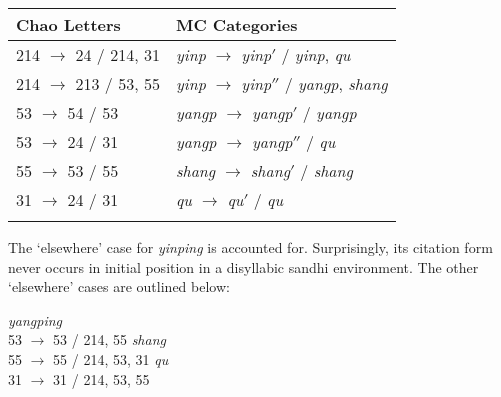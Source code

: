 \documentclass{article}
\begin{document}
\begin{exe}
\ex
\begin{tabular}[t]{ll}
Chao Letters & MC Categories \\
\hline
214 $\rightarrow$ 24 / \underline{\hspace{1em}} 214, 31 & \textit{yinp} $\rightarrow$ \textit{yinp}$'$ / \underline{\hspace{1em}} \textit{yinp}, \textit{qu} \\
214 $\rightarrow$ 213 / \underline{\hspace{1em}} 53, 55 & \textit{yinp} $\rightarrow$ \textit{yinp}$''$ / \underline{\hspace{1em}} \textit{yangp}, \textit{shang} \\
53 $\rightarrow$ 54 / \underline{\hspace{1em}} 53 & \textit{yangp} $\rightarrow$ \textit{yangp}$'$ / \underline{\hspace{1em}} \textit{yangp} \\
53 $\rightarrow$ 24 / \underline{\hspace{1em}} 31 & \textit{yangp} $\rightarrow$ \textit{yangp}$''$ / \underline{\hspace{1em}} \textit{qu} \\
55 $\rightarrow$ 53 / \underline{\hspace{1em}} 55 & \textit{shang} $\rightarrow$ \textit{shang}$'$ / \underline{\hspace{1em}} \textit{shang} \\
31 $\rightarrow$ 24 / \underline{\hspace{1em}} 31 & \textit{qu} $\rightarrow$ \textit{qu}$'$ / \underline{\hspace{1em}} \textit{qu} \\ \\
\end{tabular}
\end{exe}
The `elsewhere' case for \textit{yinping} is accounted for. Surprisingly, its citation form never occurs in initial position in a disyllabic sandhi environment. The other `elsewhere' cases are outlined below:
\begin{exe}
\ex 
\begin{xlist}
\ex \textit{yangping} \\
53 $\rightarrow$ 53 / \underline{\hspace{1em}} 214, 55
\ex \textit{shang} \\
55 $\rightarrow$ 55 / \underline{\hspace{1em}} 214, 53, 31
\ex \textit{qu} \\
31 $\rightarrow$ 31 / \underline{\hspace{1em}} 214, 53, 55
\end{xlist}
\end{exe}
\end{document}
